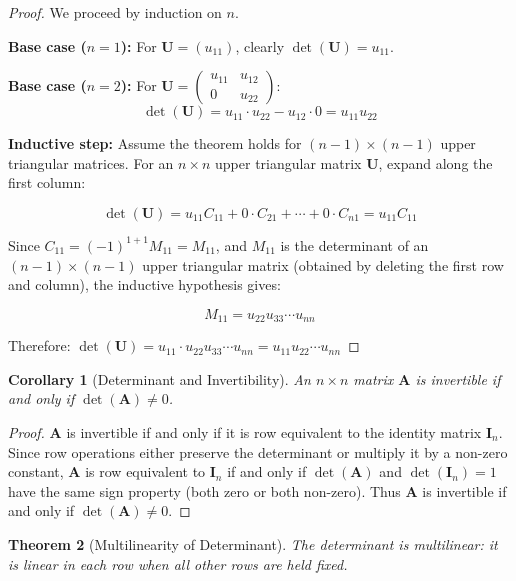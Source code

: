 \documentclass[12pt]{article}
\numberwithin{equation}{section}
\newcommand{\mat}[1]{\mathbf{#1}}        %
\theoremstyle{plain}
\newtheorem{theorem}{Theorem}[section]
\newtheorem{corollary}[theorem]{Corollary}
\theoremstyle{definition}
\theoremstyle{remark}
\begin{document}
\begin{proof}
We proceed by induction on $n$.

\textbf{Base case ($n = 1$):} For $\mat{U} = (u_{11})$, clearly $\det(\mat{U}) = u_{11}$.

\textbf{Base case ($n = 2$):} For $\mat{U} = \begin{pmatrix} u_{11} & u_{12} \\ 0 & u_{22} \end{pmatrix}$:
$$\det(\mat{U}) = u_{11} \cdot u_{22} - u_{12} \cdot 0 = u_{11}u_{22}$$

\textbf{Inductive step:} Assume the theorem holds for $(n-1) \times (n-1)$ upper triangular matrices. For an $n \times n$ upper triangular matrix $\mat{U}$, expand along the first column:

$$\det(\mat{U}) = u_{11}C_{11} + 0 \cdot C_{21} + \cdots + 0 \cdot C_{n1} = u_{11}C_{11}$$

Since $C_{11} = (-1)^{1+1}M_{11} = M_{11}$, and $M_{11}$ is the determinant of an $(n-1) \times (n-1)$ upper triangular matrix (obtained by deleting the first row and column), the inductive hypothesis gives:

$$M_{11} = u_{22}u_{33} \cdots u_{nn}$$

Therefore: $\det(\mat{U}) = u_{11} \cdot u_{22}u_{33} \cdots u_{nn} = u_{11}u_{22} \cdots u_{nn}$
\end{proof}

\begin{corollary}[Determinant and Invertibility]
An $n \times n$ matrix $\mat{A}$ is invertible if and only if $\det(\mat{A}) \neq 0$.
\end{corollary}

\begin{proof}
$\mat{A}$ is invertible if and only if it is row equivalent to the identity matrix $\mat{I}_n$. Since row operations either preserve the determinant or multiply it by a non-zero constant, $\mat{A}$ is row equivalent to $\mat{I}_n$ if and only if $\det(\mat{A})$ and $\det(\mat{I}_n) = 1$ have the same sign property (both zero or both non-zero). Thus $\mat{A}$ is invertible if and only if $\det(\mat{A}) \neq 0$.
\end{proof}

\begin{theorem}[Multilinearity of Determinant]
The determinant is multilinear: it is linear in each row when all other rows are held fixed.
\end{theorem}
\end{document}
